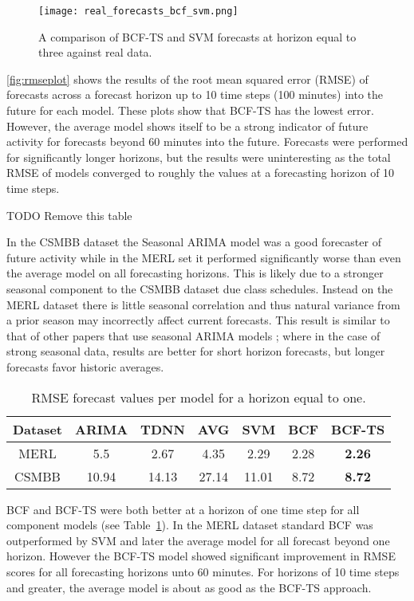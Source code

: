 \begin{figure}[h]
\centering
\texttt{[image: real\_forecasts\_bcf\_svm.png]}
\caption{A comparison of BCF-TS and SVM forecasts at horizon equal to three against real data.}
\label{fig:realbcfsvm}
\end{figure}

\ref{fig:rmseplot} shows the results of the root mean squared error (RMSE) of forecasts across a forecast horizon up to 10 time steps (100 minutes) into the future for each model.  These plots show that BCF-TS has the lowest error.  However, the average model shows itself to be a strong indicator of future activity for forecasts beyond 60 minutes into the future.  Forecasts were performed for significantly longer horizons, but the results were uninteresting as the total RMSE of models converged to roughly the values at a forecasting horizon of 10 time steps.  

TODO Remove this table


In the CSMBB dataset the Seasonal ARIMA model was a good forecaster of future activity while in the MERL set it performed significantly worse than even the average model on all forecasting horizons.  This is likely due to a stronger seasonal component to the CSMBB dataset due class schedules.  Instead on the MERL dataset there is little seasonal correlation and thus natural variance from a prior season may incorrectly affect current forecasts.  This result is similar to that of other papers that use seasonal ARIMA models \cite{Newsham2010}; where in the case of strong seasonal data, results are better for short horizon forecasts, but longer forecasts favor historic averages.

\begin{table}[t!]
\centering
\caption{RMSE forecast values per model for a horizon equal to one.}
\begin{tabular}{|c|c|c|c|c|c|c|} \hline
Dataset & ARIMA & TDNN & AVG & SVM & BCF & BCF-TS\\ \hline
MERL & 5.5 & 2.67 & 4.35 & 2.29 & 2.28 & \textbf{2.26}\\ \hline
CSMBB & 10.94 & 14.13 & 27.14 & 11.01 & 8.72 & \textbf{8.72}\\ \hline
\end{tabular}
\label{fig:rmsetab}
\end{table}

BCF and BCF-TS were both better at a horizon of one time step for all component models (see Table~\ref{fig:rmsetab}).  In the MERL dataset standard BCF was outperformed by SVM and later the average model for all forecast beyond one horizon.  However the BCF-TS model showed significant improvement in RMSE scores for all forecasting horizons unto 60 minutes.  For horizons of 10 time steps and greater, the average model is about as good as the BCF-TS approach.

